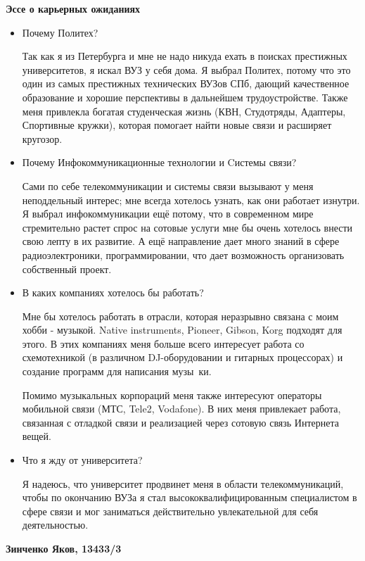 \documentclass[12pt]{article}
\begin{document}
\begin{center}
{\bf Эссе о карьерных ожиданиях}
\begin{itemize}
\item Почему Политех? \par
Так как я из Петербурга и мне не надо никуда ехать в поисках престижных университетов, я искал ВУЗ у себя дома. Я выбрал Политех, потому что это один из самых престижных технических ВУЗов СПб, дающий качественное образование и хорошие перспективы в дальнейшем трудоустройстве. Также меня привлекла богатая студенческая жизнь (КВН, Студотряды, Адаптеры, Спортивные кружки), которая помогает найти новые связи и расширяет кругозор.

\item Почему Инфокоммуникационные технологии и Cистемы связи? \par
Сами по себе телекоммуникации и системы связи вызывают у меня неподдельный интерес; мне всегда хотелось узнать, как они работает изнутри. Я выбрал инфокоммуникации ещё потому, что в современном мире стремительно растет спрос на сотовые услуги мне бы очень хотелось внести свою лепту в их развитие. 
А ещё направление дает много знаний в сфере радиоэлектроники, программировании, что дает возможность организовать собственный проект.


\item В каких компаниях хотелось бы работать? \par
Мне бы хотелось работать в отрасли, которая неразрывно связана с моим хобби - музыкой.  Native instruments, Pioneer, Gibson, Korg подходят для этого. В этих компаниях меня больше всего интересует работа со схемотехникой (в различном DJ-оборудовании и гитарных процессорах) и создание программ для написания музы~ки. \par
Помимо музыкальных корпораций меня также интересуют операторы мобильной связи (МТС, Tele2, Vodafone). В них меня привлекает работа, связанная с отладкой связи и реализацией через сотовую связь Интернета вещей.

\item Что я жду от университета? \par
Я надеюсь, что университет продвинет меня в области телекоммуникаций, чтобы по окончанию ВУЗа я стал высококвалифицированным специалистом в сфере связи и мог заниматься действительно увлекательной для себя деятельностью.
\end{itemize}
\par
\begin{flushright}
{\bf Зинченко Яков, 13433/3}
\end{flushright}

\end{center}
\end{document}
